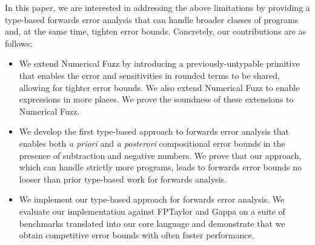In this paper, we are interested in addressing the above limitations by
providing a type-based forwards error analysis that can handle broader classes
of programs and, at the same time, tighten error bounds. 
Concretely, our contributions are as follows:
\begin{itemize}
  \item We extend Numerical Fuzz by introducing a previously-untypable primitive
    that enables the error and sensitivities in rounded terms to be shared,
    allowing for tighter error bounds. We also extend Numerical Fuzz to enable
    expressions in more places. We prove the soundness of these extensions to
    Numerical Fuzz.

  \item We develop the first type-based approach to forwards error analysis that
    enables both \textit{a priori} and \textit{a posterori} compositional error
    bounds in the presence of subtraction and negative numbers. We prove that
    our approach, which can handle strictly more programs, leads to forwards
    error bounds no looser than prior type-based work for forwards analysis.

  \item We implement our type-based approach for forwards error analysis. We
    evaluate our implementation against FPTaylor and Gappa on a suite of
    benchmarks translated into our core language and demonstrate that we obtain
    competitive error bounds with often faster performance.
\end{itemize}
